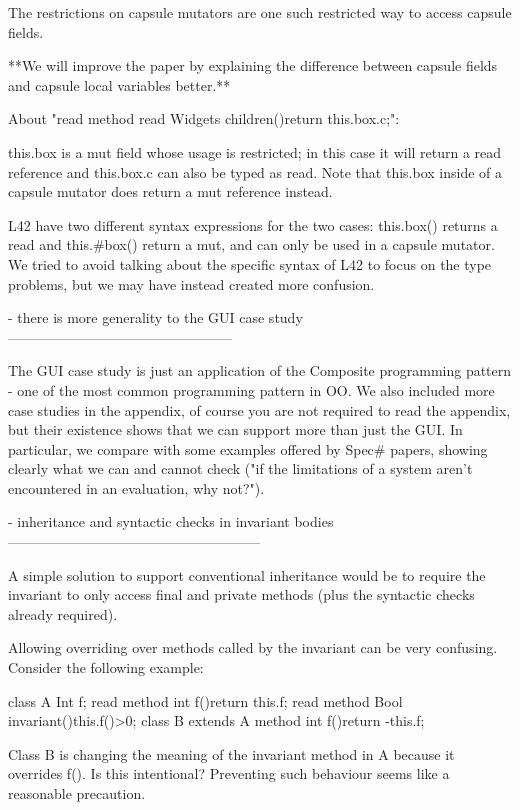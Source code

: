 The restrictions on capsule mutators are one such restricted way to access capsule fields.

**We will improve the paper by explaining the difference between capsule fields and capsule local variables better.**

About "read method read Widgets children(){return this.box.c;}":

this.box is a mut field whose usage is restricted;
in this case it will return a read reference and this.box.c can also be typed as read.
Note that this.box inside of a capsule mutator does return a mut reference instead.

L42 have two different syntax expressions for the two cases: this.box() returns a read
and this.#box() return a mut, and can only be used in a capsule mutator.
We tried to avoid talking about the specific syntax of L42 to focus on the type problems,
but we may have instead created more confusion.

- there is more generality to the GUI case study
------------------------------------------------

The GUI case study is just an application of the Composite programming pattern - one of the most common programming pattern in OO.
We also included more case studies in the appendix, of course you are not required to read the appendix,
but their existence shows that we can support more than just the GUI.
In particular, we compare with some examples offered by Spec# papers, showing clearly what
we can and cannot check ("if the limitations of a system aren't encountered in an evaluation, why not?").

- inheritance and syntactic checks in invariant bodies
------------------------------------------------------

A simple solution to support conventional inheritance would be to require the invariant to only
access final and private methods (plus the syntactic checks already required).

Allowing overriding over methods called by the invariant can be very confusing.
Consider the following example:

class A{
  Int f;
  read method int f(){return this.f;}
  read method Bool invariant(){this.f()>0;}
}
class B extends A {
  method int f(){return -this.f;}
}

Class B is changing the meaning of the invariant method in A because it overrides f().
Is this intentional? Preventing such behaviour seems like a reasonable precaution.

